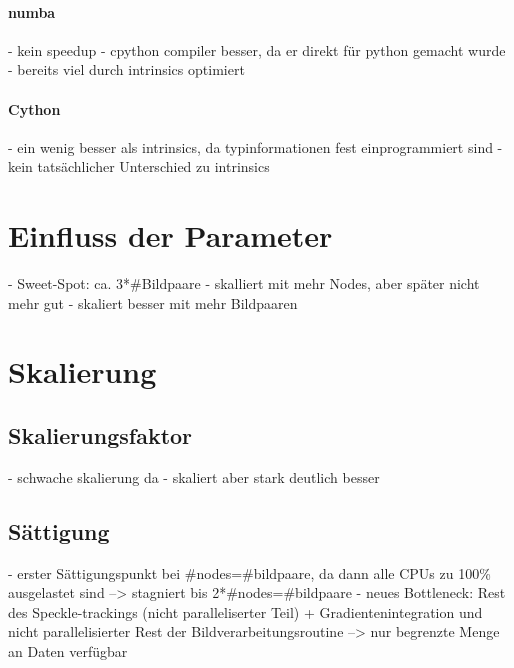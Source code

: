 \paragraph{numba}

\begin{correctmore}
	- kein speedup
	- cpython compiler besser, da er direkt für python gemacht wurde
	- bereits viel durch intrinsics optimiert
\end{correctmore}

\paragraph{Cython}

\begin{correctmore}
	- ein wenig besser als intrinsics, da typinformationen fest einprogrammiert sind
	- kein tatsächlicher Unterschied zu intrinsics
\end{correctmore}

\section{Einfluss der Parameter}

\begin{correctmore}
	- Sweet-Spot: ca. 3*#Bildpaare
	- skalliert mit mehr Nodes, aber später nicht mehr gut
	- skaliert besser mit mehr Bildpaaren
\end{correctmore}

\section{Skalierung}

\subsection{Skalierungsfaktor}

\begin{correctme}
	- schwache skalierung da
	- skaliert aber stark deutlich besser
\end{correctme}

\subsection{Sättigung}

\begin{correctmore}
	- erster Sättigungspunkt bei #nodes=#bildpaare, da dann alle CPUs zu 100\% ausgelastet sind --> stagniert bis 2*#nodes=#bildpaare
	- neues Bottleneck: Rest des Speckle-trackings (nicht paralleliserter Teil) + Gradientenintegration und nicht parallelisierter Rest der Bildverarbeitungsroutine
	--> nur begrenzte Menge an Daten verfügbar
\end{correctmore}